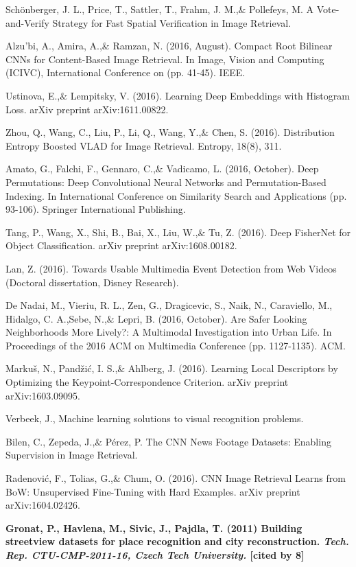 \noindent
Schönberger, J. L., Price, T., Sattler, T., Frahm, J. M.,$\&$ Pollefeys, M. A Vote-and-Verify Strategy for Fast Spatial Verification in Image Retrieval.

\noindent
Alzu'bi, A., Amira, A.,$\&$ Ramzan, N. (2016, August). Compact Root Bilinear CNNs for Content-Based Image Retrieval. In Image, Vision and Computing (ICIVC), International Conference on (pp. 41-45). IEEE.

\noindent
Ustinova, E.,$\&$ Lempitsky, V. (2016). Learning Deep Embeddings with Histogram Loss. arXiv preprint arXiv:1611.00822.

\noindent
Zhou, Q., Wang, C., Liu, P., Li, Q., Wang, Y.,$\&$ Chen, S. (2016). Distribution Entropy Boosted VLAD for Image Retrieval. Entropy, 18(8), 311.

\noindent
Amato, G., Falchi, F., Gennaro, C.,$\&$ Vadicamo, L. (2016, October). Deep Permutations: Deep Convolutional Neural Networks and Permutation-Based Indexing. In International Conference on Similarity Search and Applications (pp. 93-106). Springer International Publishing.


\noindent
Tang, P., Wang, X., Shi, B., Bai, X., Liu, W.,$\&$ Tu, Z. (2016). Deep FisherNet for Object Classification. arXiv preprint arXiv:1608.00182.

\noindent
Lan, Z. (2016). Towards Usable Multimedia Event Detection from Web Videos (Doctoral dissertation, Disney Research).

\noindent
De Nadai, M., Vieriu, R. L., Zen, G., Dragicevic, S., Naik, N., Caraviello, M., Hidalgo, C. A.,Sebe, N.,$\&$ Lepri, B. (2016, October). Are Safer Looking Neighborhoods More Lively?: A Multimodal Investigation into Urban Life. In Proceedings of the 2016 ACM on Multimedia Conference (pp. 1127-1135). ACM.

\noindent
Markuš, N., Pandžić, I. S.,$\&$ Ahlberg, J. (2016). Learning Local Descriptors by Optimizing the Keypoint-Correspondence Criterion. arXiv preprint arXiv:1603.09095.

\noindent
Verbeek, J., Machine learning solutions to visual recognition problems.

\noindent
Bilen, C., Zepeda, J.,$\&$ Pérez, P. The CNN News Footage Datasets: Enabling Supervision in Image Retrieval.

\noindent
Radenović, F., Tolias, G.,$\&$ Chum, O. (2016). CNN Image Retrieval Learns from BoW: Unsupervised Fine-Tuning with Hard Examples. arXiv preprint arXiv:1604.02426.


\vfill
\newpage
\noindent
\textbf{
	Gronat, P., Havlena, M., Sivic, J., Pajdla, T. (2011) 
	Building streetview datasets for place recognition and city reconstruction. 
	\textit{Tech. Rep. CTU-CMP-2011-16, Czech Tech University.}
	[cited by 8]
}


